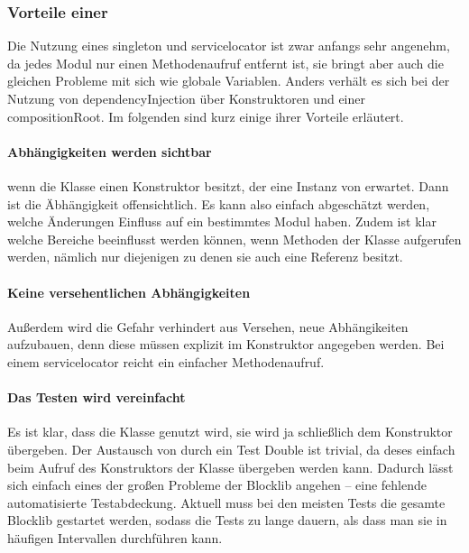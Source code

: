 \subsubsection{Vorteile einer }

Die Nutzung eines \gls{singleton} und \gls{servicelocator} ist zwar anfangs sehr angenehm, da jedes Modul nur einen Methodenaufruf entfernt ist, sie bringt aber auch die gleichen Probleme mit sich wie globale Variablen. Anders verhält es sich bei der Nutzung von \gls{dependencyInjection} über Konstruktoren und einer \gls{compositionRoot}. Im folgenden sind kurz einige ihrer Vorteile erläutert.

\paragraph{Abhängigkeiten werden sichtbar} wenn die Klasse einen Konstruktor besitzt, der eine Instanz von  erwartet. Dann ist die Äbhängigkeit offensichtlich. Es kann also einfach abgeschätzt werden, welche Änderungen Einfluss auf ein bestimmtes Modul haben. Zudem ist klar welche Bereiche beeinflusst werden können, wenn Methoden der Klasse aufgerufen werden, nämlich nur diejenigen zu denen sie auch eine Referenz besitzt.

\paragraph{Keine versehentlichen Abhängigkeiten} Außerdem wird die Gefahr verhindert aus Versehen, neue Abhängikeiten aufzubauen, denn diese müssen explizit im Konstruktor angegeben werden. Bei einem \gls{servicelocator} reicht ein einfacher Methodenaufruf.

\paragraph{Das Testen wird vereinfacht} Es ist klar, dass die Klasse  genutzt wird, sie wird ja schließlich dem Konstruktor übergeben. Der Austausch von  durch ein Test Double ist trivial, da deses einfach beim Aufruf des Konstruktors der Klasse übergeben werden kann. Dadurch lässt sich einfach eines der großen Probleme der Blocklib angehen -- eine fehlende automatisierte Testabdeckung. Aktuell muss bei den meisten Tests die gesamte Blocklib gestartet werden, sodass die Tests zu lange dauern, als dass man sie in häufigen Intervallen durchführen kann.

